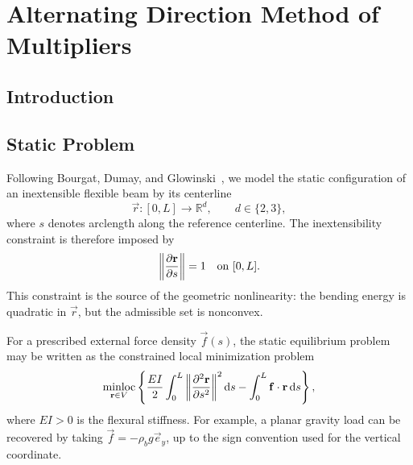 \chapter{Alternating Direction Method of Multipliers}
\label{chap:addm}

\section{Introduction}

\section{Static Problem}

Following Bourgat, Dumay, and Glowinski~\autocite{glowinski_large_nodate}, we
model the static configuration of an inextensible flexible beam by its
centerline
\begin{equation*}
    \vec r : [0,L] \to \mathbb{R}^d, \qquad d \in \{2,3\},
\end{equation*}
where \(s\) denotes arclength along the reference centerline. The inextensibility
constraint is therefore imposed by
\begin{equation}\label{eq:addm-static-inextensibility}
    \left\lVert \pdv{\mathbf{r}}{s} \right\rVert = 1 \quad \text{on } [0,L].
\end{equation}
This constraint is the source of the geometric nonlinearity: the bending energy
is quadratic in \(\vec r\), but the admissible set is nonconvex.

For a prescribed external force density \(\vec f(s)\), the static equilibrium
problem may be written as the constrained local minimization problem
\begin{equation}\label{eq:addm-static-minloc}
    \minloc_{\vec r \in V}
    \left\{
    \frac{EI}{2}
    \int_0^L \norm{\pdv[2]{\vec r}{s}}^2 \odif{s}
    -
    \int_0^L \vec f \cdot \vec r \odif{s}
    \right\},
\end{equation}
where \(EI>0\) is the flexural stiffness. For example, a planar gravity load can
be recovered by taking \(\vec f = -\rho_b g \vec e_y\), up to the sign convention
used for the vertical coordinate.

